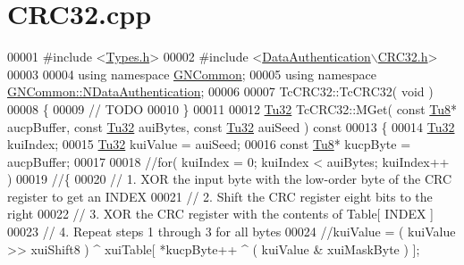 \hypertarget{_c_r_c32_8cpp_source}{}\section{C\+R\+C32.\+cpp}
\label{_c_r_c32_8cpp_source}

\begin{DoxyCode}
00001 \textcolor{preprocessor}{#include <\mbox{\hyperlink{_types_8h}{Types.h}}>}
00002 \textcolor{preprocessor}{#include <\mbox{\hyperlink{_c_r_c32_8h}{DataAuthentication\(\backslash\)CRC32.h}}>}
00003 
00004 \textcolor{keyword}{using namespace }\mbox{\hyperlink{namespace_g_n_common}{GNCommon}};
00005 \textcolor{keyword}{using namespace }\mbox{\hyperlink{namespace_g_n_common_1_1_n_data_authentication}{GNCommon::NDataAuthentication}};
00006 
00007 TcCRC32::TcCRC32( \textcolor{keywordtype}{void} )
00008 \{
00009    \textcolor{comment}{// TODO}
00010 \}
00011 
00012 \mbox{\hyperlink{namespace_g_n_common_a941b527ef318f318aed7903dc832b7e4}{Tu32}} TcCRC32::MGet( \textcolor{keyword}{const} \mbox{\hyperlink{namespace_g_n_common_a7939e251ddbf5d3a31832dcfdc8bde39}{Tu8}}* aucpBuffer, \textcolor{keyword}{const} \mbox{\hyperlink{namespace_g_n_common_a941b527ef318f318aed7903dc832b7e4}{Tu32}} auiBytes, \textcolor{keyword}{const} 
      \mbox{\hyperlink{namespace_g_n_common_a941b527ef318f318aed7903dc832b7e4}{Tu32}} auiSeed )\textcolor{keyword}{ const}
00013 \textcolor{keyword}{}\{
00014    \mbox{\hyperlink{namespace_g_n_common_a941b527ef318f318aed7903dc832b7e4}{Tu32}}       kuiIndex;
00015    \mbox{\hyperlink{namespace_g_n_common_a941b527ef318f318aed7903dc832b7e4}{Tu32}}       kuiValue = auiSeed;
00016    \textcolor{keyword}{const} \mbox{\hyperlink{namespace_g_n_common_a7939e251ddbf5d3a31832dcfdc8bde39}{Tu8}}* kucpByte = aucpBuffer;
00017 
00018    \textcolor{comment}{//for( kuiIndex = 0; kuiIndex < auiBytes; kuiIndex++ )}
00019    \textcolor{comment}{//\{}
00020       \textcolor{comment}{// 1. XOR the input byte with the low-order byte of the CRC register to get an INDEX}
00021       \textcolor{comment}{// 2. Shift the CRC register eight bits to the right}
00022       \textcolor{comment}{// 3. XOR the CRC register with the contents of Table[ INDEX ]}
00023       \textcolor{comment}{// 4. Repeat steps 1 through 3 for all bytes}
00024       \textcolor{comment}{//kuiValue = ( kuiValue >> xuiShift8 ) ^ xuiTable[ *kucpByte++ ^ ( kuiValue & xuiMaskByte ) ];}

\end{DoxyCode}
